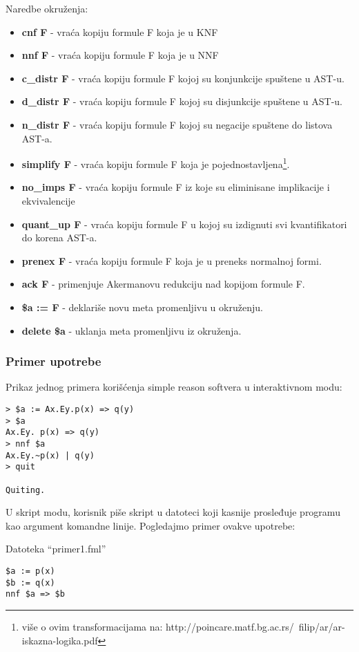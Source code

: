 \documentclass[a4paper]{article}
\begin{document}
Naredbe okruženja:
\begin{itemize}
	\item \textbf{cnf F} - vraća kopiju formule F koja je u KNF
	\item \textbf{nnf F} - vraća kopiju formule F koja je u NNF
	\item \textbf{c\_distr F} - vraća kopiju formule F kojoj su konjunkcije spuštene u AST-u.
	\item \textbf{d\_distr F} - vraća kopiju formule F kojoj su disjunkcije spuštene u AST-u.
	\item \textbf{n\_distr F} - vraća kopiju formule F kojoj su negacije spuštene do listova AST-a.
	\item \textbf{simplify F} - vraća kopiju formule F koja je pojednostavljena\footnote{više o ovim transformacijama na: http://poincare.matf.bg.ac.rs/~filip/ar/ar-iskazna-logika.pdf}.
	\item \textbf{no\_imps F} - vraća kopiju formule F iz koje su eliminisane implikacije i ekvivalencije
	\item \textbf{quant\_up F} - vraća kopiju formule F u kojoj su izdignuti svi kvantifikatori do korena AST-a.
	\item \textbf{prenex F} - vraća kopiju formule F koja je u preneks normalnoj formi.
	\item \textbf{ack F} - primenjuje Akermanovu redukciju nad kopijom formule F.
	\item \textbf{\$a := F} - deklariše novu meta promenljivu u okruženju.
	\item \textbf{delete \$a} - uklanja meta promenljivu iz okruženja.
\end{itemize}

\subsubsection*{Primer upotrebe}
Prikaz jednog primera korišćenja simple reason softvera u interaktivnom modu:
\begin{verbatim}
> $a := Ax.Ey.p(x) => q(y)
> $a
Ax.Ey. p(x) => q(y)
> nnf $a
Ax.Ey.~p(x) | q(y)
> quit

Quiting.
\end{verbatim}

U skript modu, korisnik piše skript u datoteci koji kasnije prosleđuje programu kao argument komandne linije. Pogledajmo primer ovakve upotrebe:


\bigskip
Datoteka ``primer1.fml''
\begin{verbatim}
$a := p(x)
$b := q(x)
nnf $a => $b
\end{verbatim}
\end{document}
